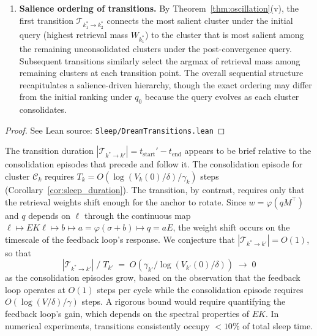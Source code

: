 \begin{theorem}
\begin{enumerate}
\item \textbf{Salience ordering of transitions.}  By Theorem~\ref{thm:oscillation}(v), the first transition $\mathcal{T}_{k^*_1 \to k^*_2}$ connects the most salient cluster under the initial query (highest retrieval mass $W_{k^*_1}$) to the cluster that is most salient among the remaining unconsolidated clusters under the post-convergence query.  Subsequent transitions similarly select the argmax of retrieval mass among remaining clusters at each transition point.  The overall sequential structure recapitulates a salience-driven hierarchy, though the exact ordering may differ from the initial ranking under $q_0$ because the query evolves as each cluster consolidates.

\end{enumerate}
\end{theorem}

\begin{proof}
\leanok
{}
See Lean source: \texttt{Sleep/DreamTransitions.lean}
\end{proof}

\begin{remark}
\label{rem:transition_brevity}
\leanok
{}
The transition duration $|\mathcal{T}_{k^* \to k'}| = t_{\mathrm{start}}' - t_{\mathrm{end}}$ appears to be brief relative to the consolidation episodes that precede and follow it.  The consolidation episode for cluster $\mathcal{C}_k$ requires $T_k = O(\log(V_k(0)/\delta)/\gamma_k)$ steps (Corollary~\ref{cor:sleep_duration}).  The transition, by contrast, requires only that the retrieval weights shift enough for the anchor to rotate.  Since $w = \varphi(qM^\top)$ and $q$ depends on $\ell$ through the continuous map $\ell \mapsto EK\ell \mapsto b \mapsto a = \varphi(\sigma + b) \mapsto q = aE$, the weight shift occurs on the timescale of the feedback loop's response.  We conjecture that $|\mathcal{T}_{k^* \to k'}| = O(1)$, so that
\[
|\mathcal{T}_{k^* \to k'}| \;/\; T_{k'} \;=\; O(\gamma_{k'} / \log(V_{k'}(0)/\delta)) \;\to\; 0
\]
as the consolidation episodes grow, based on the observation that the feedback loop operates at $O(1)$ steps per cycle while the consolidation episode requires $O(\log(V/\delta)/\gamma)$ steps.  A rigorous bound would require quantifying the feedback loop's gain, which depends on the spectral properties of $EK$.  In numerical experiments, transitions consistently occupy $< 10\%$ of total sleep time.
\end{remark}

